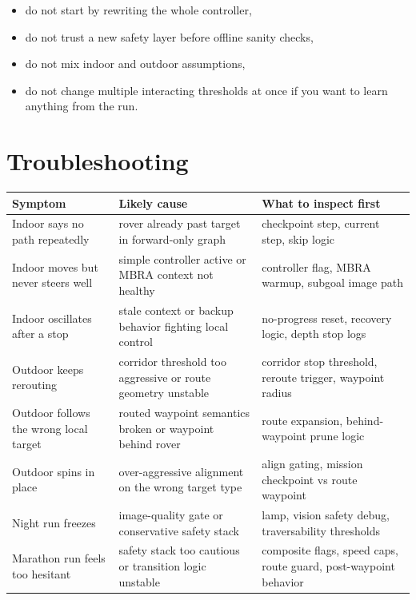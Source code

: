 \documentclass[11pt]{article}
\begin{document}
\begin{itemize}[nosep]
  \item do not start by rewriting the whole controller,
  \item do not trust a new safety layer before offline sanity checks,
  \item do not mix indoor and outdoor assumptions,
  \item do not change multiple interacting thresholds at once if you want to learn
  anything from the run.
\end{itemize}

\section{Troubleshooting}

\begin{longtable}{p{}p{}p{}}
\toprule
\textbf{Symptom} & \textbf{Likely cause} & \textbf{What to inspect first} \\
\midrule
Indoor says no path repeatedly & rover already past target in forward-only graph & checkpoint step, current step, skip logic \\
Indoor moves but never steers well & simple controller active or MBRA context not healthy & controller flag, MBRA warmup, subgoal image path \\
Indoor oscillates after a stop & stale context or backup behavior fighting local control & no-progress reset, recovery logic, depth stop logs \\
Outdoor keeps rerouting & corridor threshold too aggressive or route geometry unstable & corridor stop threshold, reroute trigger, waypoint radius \\
Outdoor follows the wrong local target & routed waypoint semantics broken or waypoint behind rover & route expansion, behind-waypoint prune logic \\
Outdoor spins in place & over-aggressive alignment on the wrong target type & align gating, mission checkpoint vs route waypoint \\
Night run freezes & image-quality gate or conservative safety stack & lamp, vision safety debug, traversability thresholds \\
Marathon run feels too hesitant & safety stack too cautious or transition logic unstable & composite flags, speed caps, route guard, post-waypoint behavior \\
\bottomrule
\end{longtable}
\end{document}
